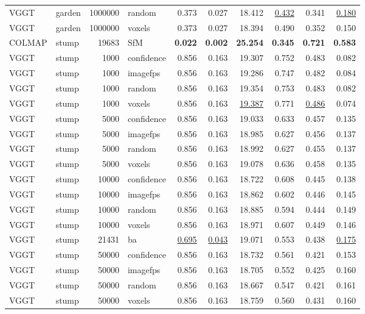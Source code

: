 \begin{table}[H]
\begin{tabular}{llrlrrrrrr}
VGGT & garden & 1000000 & random & 0.373 & 0.027 & 18.412 & \underline{0.432} & 0.341 & \underline{0.180} \\
VGGT & garden & 1000000 & voxels & 0.373 & 0.027 & 18.394 & 0.490 & 0.352 & 0.150 \\
\midrule
COLMAP & stump & 19683 & SfM & \textbf{0.022} & \textbf{0.002} & \textbf{25.254} & \textbf{0.345} & \textbf{0.721} & \textbf{0.583} \\
VGGT & stump & 1000 & confidence & 0.856 & 0.163 & 19.307 & 0.752 & 0.483 & 0.082 \\
VGGT & stump & 1000 & imagefps & 0.856 & 0.163 & 19.286 & 0.747 & 0.482 & 0.084 \\
VGGT & stump & 1000 & random & 0.856 & 0.163 & 19.354 & 0.753 & 0.483 & 0.082 \\
VGGT & stump & 1000 & voxels & 0.856 & 0.163 & \underline{19.387} & 0.771 & \underline{0.486} & 0.074 \\
VGGT & stump & 5000 & confidence & 0.856 & 0.163 & 19.033 & 0.633 & 0.457 & 0.135 \\
VGGT & stump & 5000 & imagefps & 0.856 & 0.163 & 18.985 & 0.627 & 0.456 & 0.137 \\
VGGT & stump & 5000 & random & 0.856 & 0.163 & 18.992 & 0.627 & 0.455 & 0.137 \\
VGGT & stump & 5000 & voxels & 0.856 & 0.163 & 19.078 & 0.636 & 0.458 & 0.135 \\
VGGT & stump & 10000 & confidence & 0.856 & 0.163 & 18.722 & 0.608 & 0.445 & 0.138 \\
VGGT & stump & 10000 & imagefps & 0.856 & 0.163 & 18.862 & 0.602 & 0.446 & 0.145 \\
VGGT & stump & 10000 & random & 0.856 & 0.163 & 18.885 & 0.594 & 0.444 & 0.149 \\
VGGT & stump & 10000 & voxels & 0.856 & 0.163 & 18.971 & 0.607 & 0.449 & 0.146 \\
VGGT & stump & 21431 & ba & \underline{0.695} & \underline{0.043} & 19.071 & 0.553 & 0.438 & \underline{0.175} \\
VGGT & stump & 50000 & confidence & 0.856 & 0.163 & 18.732 & 0.561 & 0.421 & 0.153 \\
VGGT & stump & 50000 & imagefps & 0.856 & 0.163 & 18.705 & 0.552 & 0.425 & 0.160 \\
VGGT & stump & 50000 & random & 0.856 & 0.163 & 18.667 & 0.547 & 0.421 & 0.161 \\
VGGT & stump & 50000 & voxels & 0.856 & 0.163 & 18.759 & 0.560 & 0.431 & 0.160 \\

\end{tabular}
\end{table}
